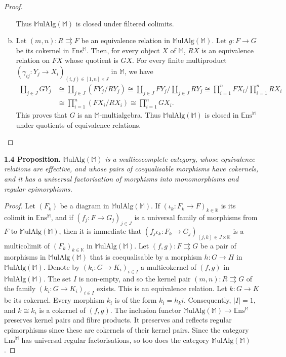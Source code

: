 \documentclass{article}
\newenvironment{itenv}[1]
  {\phantomsection\par\medskip\noindent\textbf{#1.}\itshape}
  {\par\medskip}
\newcommand{\bb}[1]{{\mathbb{#1}}}
\newcommand{\Set}{\mathbb{E}\mathrm{ns}}
\newcommand{\MulAlg}{\mathbb{M}\mathrm{ulAlg}}
\newcommand{\oldpage}[1]{\marginpar{\footnotesize$\Big\vert$ \textit{p.~#1}}}
\begin{document}
\begin{proof}
\begin{enumerate}[a)]
      Thus $\MulAlg(\bb{M})$ is closed under filtered colimits.
    \item Let $(m,n)\colon R\rightrightarrows F$ be an equivalence relation in $\MulAlg(\bb{M})$.
      Let $g\colon F\to G$ be its cokernel in $\Set^\bb{M}$.
      Then, for every object $X$ of $\bb{M}$, $RX$ is an equivalence relation on $FX$ whose quotient is $GX$.
      For every finite multiproduct $(\gamma_{ij}\colon Y_j\to X_i)_{(i,j)\in[1,n]\times J}$ in $\bb{M}$, we have
      \[
        \begin{aligned}
          \coprod_{j\in J} GY_j
          &\cong \coprod_{j\in J} (FY_j/RY_j)
          \cong \coprod_{j\in J} FY_j \Big/ \coprod_{j\in J} RY_j
          \cong \prod_{i=1}^n FX_i \Big/ \prod_{i=1}^n RX_i
        \\&\cong \prod_{i=1}^n (FX_i/RX_i)
          \cong \prod_{i=1}^n GX_i.
        \end{aligned}
      \]
      This proves that $G$ is an $\bb{M}$-multialgebra.
      Thus $\MulAlg(\bb{M})$ is closed in $\Set^\bb{M}$ under quotients of equivalence relations.
  \end{enumerate}
\end{proof}

\oldpage{199}
\begin{itenv}{1.4 Proposition}
\label{1.4}
  $\MulAlg(\bb{M})$ is a multicocomplete category, whose equivalence relations are effective, and whose pairs of coequalisable morphisms have cokernels, and it has a universal factorisation of morphisms into monomorphisms and regular epimorphisms.
\end{itenv}

\begin{proof}
  Let $(F_k)$ be a diagram in $\MulAlg(\bb{M})$.
  If $(\iota_k\colon F_k\to F)_{k\in\bb{K}}$ is its colimit in $\Set^\bb{M}$, and if $(f_j\colon F\to G_j)_{j\in J}$ is a universal family of morphisms from $F$ to $\MulAlg(\bb{M})$, then it is immediate that $(f_j\iota_k\colon F_k\to G_j)_{(j,k)\in J\times\bb{K}}$ is a multicolimit of $(F_k)_{k\in\bb{K}}$ in $\MulAlg(\bb{M})$.
  Let $(f,g)\colon F\rightrightarrows G$ be a pair of morphisms in $\MulAlg(\bb{M})$ that is coequalisable by a morphism $h\colon G\to H$ in $\MulAlg(\bb{M})$.
  Denote by $(k_i\colon G\to K_i)_{i\in I}$ a multicokernel of $(f,g)$ in $\MulAlg(\bb{M})$.
  The set $I$ is non-empty, and so the kernel pair $(m,n)\colon R\rightrightarrows G$ of the family $(k_i\colon G\to K_i)_{i\in I}$ exists.
  This is an equivalence relation.
  Let $k\colon G\to K$ be its cokernel.
  Every morphism $k_i$ is of the form $k_i=h_ki$.
  Consequently, $|I|=1$, and $k\cong k_i$ is a cokernel of $(f,g)$.
  The inclusion functor $\MulAlg(\bb{M})\to\Set^\bb{M}$ preserves kernel pairs and fibre products.
  It preserves and reflects regular epimorphisms since these are cokernels of their kernel pairs.
  Since the category $\Set^\bb{M}$ has universal regular factorisations, so too does the category $\MulAlg(\bb{M})$.
\end{proof}
\end{document}
